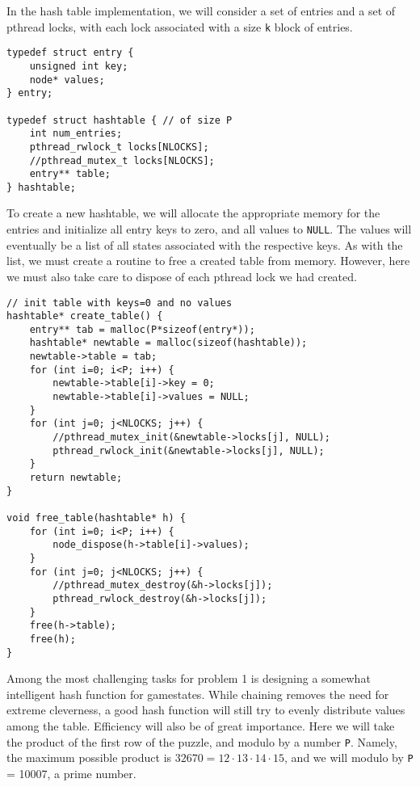 \documentclass[11pt]{article}
\begin{document}
In the hash table implementation, we will consider a set of entries
and a set of pthread locks, with each lock associated with a size \verb~k~
block of entries.

\begin{verbatim}
typedef struct entry {
    unsigned int key;
    node* values;
} entry;

typedef struct hashtable { // of size P
    int num_entries;
    pthread_rwlock_t locks[NLOCKS];
    //pthread_mutex_t locks[NLOCKS];
    entry** table;
} hashtable;
\end{verbatim}

To create a new hashtable, we will allocate the appropriate memory for
the entries and initialize all entry keys to zero, and all values to
\verb~NULL~. The values will eventually be a list of all states associated
with the respective keys. As with the list, we must create a routine
to free a created table from memory. However, here we must also take
care to dispose of each pthread lock we had created.

\begin{verbatim}
// init table with keys=0 and no values
hashtable* create_table() {
    entry** tab = malloc(P*sizeof(entry*));
    hashtable* newtable = malloc(sizeof(hashtable));
    newtable->table = tab;
    for (int i=0; i<P; i++) {
        newtable->table[i]->key = 0;
        newtable->table[i]->values = NULL;
    }
    for (int j=0; j<NLOCKS; j++) {
        //pthread_mutex_init(&newtable->locks[j], NULL);
        pthread_rwlock_init(&newtable->locks[j], NULL);
    }
    return newtable;
}

void free_table(hashtable* h) {
    for (int i=0; i<P; i++) {
        node_dispose(h->table[i]->values);
    }
    for (int j=0; j<NLOCKS; j++) {
        //pthread_mutex_destroy(&h->locks[j]);
        pthread_rwlock_destroy(&h->locks[j]);
    }
    free(h->table);
    free(h);
}
\end{verbatim}

Among the most challenging tasks for problem 1 is designing a somewhat
intelligent hash function for gamestates. While chaining removes the
need for extreme cleverness, a good hash function will still try to
evenly distribute values among the table. Efficiency will also be of
great importance. Here we will take the product of the first row of
the puzzle, and modulo by a number \verb~P~. Namely, the maximum possible
product is $32670 = 12\cdot 13 \cdot 14\cdot 15$, and we will modulo
by \verb~P~ = 10007, a prime number.
\end{document}
